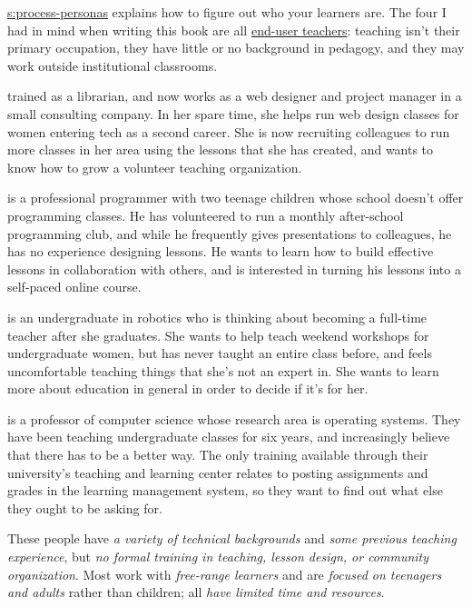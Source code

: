 \protect\hyperlink{SECTION}{s:process-personas} explains how to figure out who your
learners are. The four I had in mind when writing this book are all
\protect\hyperlink{g:end-user-teacher}{end-user teachers}: teaching isn't
their primary occupation, they have little or no background in pedagogy,
and they may work outside institutional classrooms.

\begin{description}
\tightlist
\item[Emily]
trained as a librarian, and now works as a web designer and project
manager in a small consulting company. In her spare time, she helps
run web design classes for women entering tech as a second career.
She is now recruiting colleagues to run more classes in her area
using the lessons that she has created, and wants to know how to
grow a volunteer teaching organization.
\item[Moshe]
is a professional programmer with two teenage children whose school
doesn't offer programming classes. He has volunteered to run a
monthly after-school programming club, and while he frequently gives
presentations to colleagues, he has no experience designing lessons.
He wants to learn how to build effective lessons in collaboration
with others, and is interested in turning his lessons into a
self-paced online course.
\item[Samira]
is an undergraduate in robotics who is thinking about becoming a
full-time teacher after she graduates. She wants to help teach
weekend workshops for undergraduate women, but has never taught an
entire class before, and feels uncomfortable teaching things that
she's not an expert in. She wants to learn more about education in
general in order to decide if it's for her.
\item[Gene]
is a professor of computer science whose research area is operating
systems. They have been teaching undergraduate classes for six
years, and increasingly believe that there has to be a better way.
The only training available through their university's teaching and
learning center relates to posting assignments and grades in the
learning management system, so they want to find out what else they
ought to be asking for.
\end{description}

These people have \emph{a variety of technical backgrounds} and \emph{some
previous teaching experience}, but \emph{no formal training in teaching,
lesson design, or community organization}. Most work with \emph{free-range
learners} and are \emph{focused on teenagers and adults} rather than
children; all \emph{have limited time and resources}.

